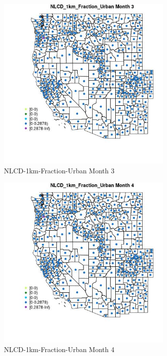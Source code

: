 \begin{figure} 
\centering  
\includegraphics[width=0.77\textwidth]{Code_Outputs/df_report_ML_predictors_CountyCentroid_Locations_Dates_2008-01-01to2018-12-31_MapObsMo3NLCD_1km_Fraction_Urban.jpg} 
\caption{\label{fig:df_report_ML_predictors_CountyCentroid_Locations_Dates_2008-01-01to2018-12-31MapObsMo3NLCD_1km_Fraction_Urban}NLCD-1km-Fraction-Urban Month 3} 
\end{figure} 
 

\clearpage 

\begin{figure} 
\centering  
\includegraphics[width=0.77\textwidth]{Code_Outputs/df_report_ML_predictors_CountyCentroid_Locations_Dates_2008-01-01to2018-12-31_MapObsMo4NLCD_1km_Fraction_Urban.jpg} 
\caption{\label{fig:df_report_ML_predictors_CountyCentroid_Locations_Dates_2008-01-01to2018-12-31MapObsMo4NLCD_1km_Fraction_Urban}NLCD-1km-Fraction-Urban Month 4} 
\end{figure} 
 

